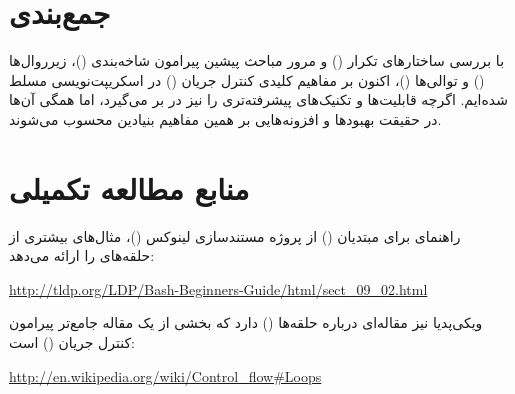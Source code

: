\section{جمع‌بندی}

با بررسی ساختارهای تکرار () و مرور مباحث پیشین پیرامون شاخه‌بندی ()، زیرروال‌ها () و توالی‌ها ()، اکنون بر مفاهیم کلیدی کنترل جریان () در اسکریپت‌نویسی  مسلط شده‌ایم. اگرچه  قابلیت‌ها و تکنیک‌های پیشرفته‌تری را نیز در بر می‌گیرد، اما همگی آن‌ها در حقیقت بهبودها و افزونه‌هایی بر همین مفاهیم بنیادین محسوب می‌شوند.

\section{منابع مطالعه تکمیلی}

راهنمای  برای مبتدیان () از پروژه مستندسازی لینوکس ()، مثال‌های بیشتری از حلقه‌های  را ارائه می‌دهد:

\begin{latin}
\url{http://tldp.org/LDP/Bash-Beginners-Guide/html/sect_09_02.html}
\end{latin}

ویکی‌پدیا نیز مقاله‌ای درباره حلقه‌ها () دارد که بخشی از یک مقاله جامع‌تر پیرامون کنترل جریان () است:

\begin{latin}
\url{http://en.wikipedia.org/wiki/Control_flow#Loops}
\end{latin}
